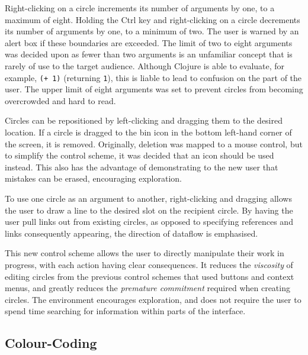 \documentclass[12pt,twoside,notitlepage,xetex]{report}
\begin{document}
{Right-clicking on a circle increments its number of arguments by one, to a maximum of eight.  Holding the Ctrl key and right-clicking on a circle decrements its number of arguments by one, to a minimum of two.  The user is warned by an alert box if these boundaries are exceeded.  The limit of two to eight arguments was decided upon as fewer than two arguments is an unfamiliar concept that is rarely of use to the target audience.  Although Clojure is able to evaluate, for example, \verb¬(+ 1)¬ (returning \verb¬1¬), this is liable to lead to confusion on the part of the user.  The upper limit of eight arguments was set to prevent circles from becoming overcrowded and hard to read.

Circles can be repositioned by left-clicking and dragging them to the desired location.  If a circle is dragged to the bin icon in the bottom left-hand corner of the screen, it is removed.  Originally, deletion was mapped to a mouse control, but to simplify the control scheme, it was decided that an icon should be used instead.  This also has the advantage of demonstrating to the new user that mistakes can be erased, encouraging exploration.

To use one circle as an argument to another, right-clicking and dragging allows the user to draw a line to the desired slot on the recipient circle.  By having the user pull links out from existing circles, as opposed to specifying references and links consequently appearing, the direction of dataflow is emphasised.

This new control scheme allows the user to directly manipulate their work in progress, with each action having clear consequences.  It reduces the \emph{viscosity} of editing circles from the previous control schemes that used buttons and context menus, and greatly reduces the \emph{premature commitment} required when creating circles.  The environment encourages exploration, and does not require the user to spend time searching for information within parts of the interface.

\subsection{Colour-Coding}

}
\end{document}

